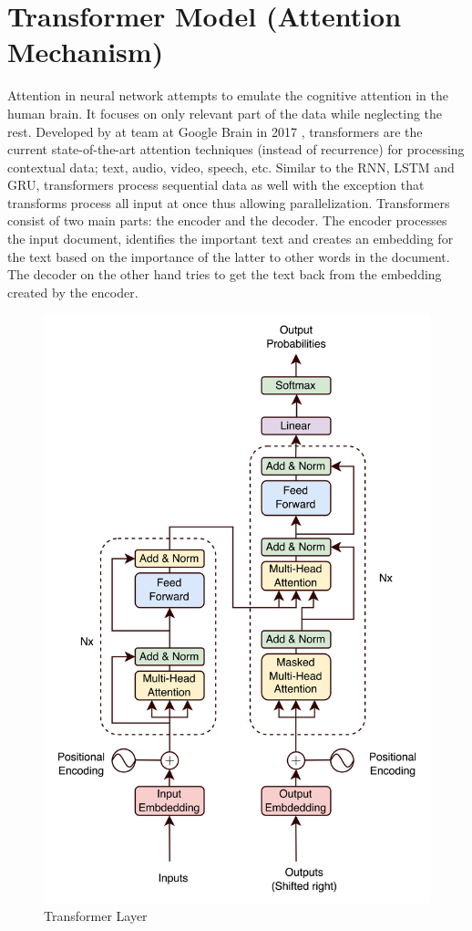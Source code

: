 \section{Transformer Model (Attention Mechanism)}
Attention in neural network attempts to emulate the cognitive attention in the human brain. It focuses on only relevant part of the data while neglecting the rest. Developed by at team at Google Brain in 2017 \cite{Vaswani2017}, transformers are the current state-of-the-art attention techniques (instead of recurrence) for processing contextual data; text, audio, video, speech, etc. Similar to the RNN, LSTM and GRU, transformers process sequential data as well with the exception that transforms process all input at once thus allowing parallelization. Transformers consist of two main parts: the encoder and the decoder. The encoder processes the input document, identifies the important text and creates an embedding for the text based on the importance of the latter to other words in the document. The decoder on the other hand tries to get the text back from the embedding created by the encoder.
\begin{figure}[H]
    \centering
    \includegraphics[scale=1.1]{CHAPTER_4/c4_fig_transformer_layer_draw.png}
    \caption{Transformer Layer \protect\cite{Vaswani2017}}
    \label{TRANSFORMER_LAYER}
  \end{figure}
